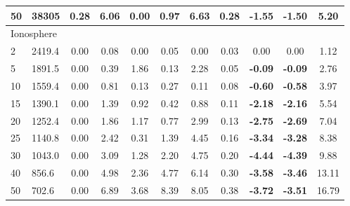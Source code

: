 {\begin{longtable}{@{}llccccccccc@{}}
\multicolumn{1}{l|}{50} & \multicolumn{1}{l|}{38305}      & 0.28 & \multicolumn{1}{c|}{6.06}  & 0.00  & \multicolumn{1}{c|}{0.97} & 6.63  & \multicolumn{1}{c|}{0.28} & \textbf{-1.55} & \textbf{-1.50} & 5.20  \\ \hline
\multicolumn{11}{l}{Ionosphere}                                                                                                                                                                                 \\ \hline
\multicolumn{1}{l|}{2}  & \multicolumn{1}{l|}{2419.4}     & 0.00 & \multicolumn{1}{c|}{0.08}  & 0.00  & \multicolumn{1}{c|}{0.05} & 0.00  & \multicolumn{1}{c|}{0.03} & 0.00           & 0.00           & 1.12  \\
\multicolumn{1}{l|}{5}  & \multicolumn{1}{l|}{1891.5}     & 0.00 & \multicolumn{1}{c|}{0.39}  & 1.86  & \multicolumn{1}{c|}{0.13} & 2.28  & \multicolumn{1}{c|}{0.05} & \textbf{-0.09} & \textbf{-0.09} & 2.76  \\
\multicolumn{1}{l|}{10} & \multicolumn{1}{l|}{1559.4}     & 0.00 & \multicolumn{1}{c|}{0.81}  & 0.13  & \multicolumn{1}{c|}{0.27} & 0.11  & \multicolumn{1}{c|}{0.08} & \textbf{-0.60} & \textbf{-0.58} & 3.97  \\
\multicolumn{1}{l|}{15} & \multicolumn{1}{l|}{1390.1}     & 0.00 & \multicolumn{1}{c|}{1.39}  & 0.92  & \multicolumn{1}{c|}{0.42} & 0.88  & \multicolumn{1}{c|}{0.11} & \textbf{-2.18} & \textbf{-2.16} & 5.54  \\
\multicolumn{1}{l|}{20} & \multicolumn{1}{l|}{1252.4}     & 0.00 & \multicolumn{1}{c|}{1.86}  & 1.17  & \multicolumn{1}{c|}{0.77} & 2.99  & \multicolumn{1}{c|}{0.13} & \textbf{-2.75} & \textbf{-2.69} & 7.04  \\
\multicolumn{1}{l|}{25} & \multicolumn{1}{l|}{1140.8}     & 0.00 & \multicolumn{1}{c|}{2.42}  & 0.31  & \multicolumn{1}{c|}{1.39} & 4.45  & \multicolumn{1}{c|}{0.16} & \textbf{-3.34} & \textbf{-3.28} & 8.38  \\
\multicolumn{1}{l|}{30} & \multicolumn{1}{l|}{1043.0}     & 0.00 & \multicolumn{1}{c|}{3.09}  & 1.28  & \multicolumn{1}{c|}{2.20} & 4.75  & \multicolumn{1}{c|}{0.20} & \textbf{-4.44} & \textbf{-4.39} & 9.88  \\
\multicolumn{1}{l|}{40} & \multicolumn{1}{l|}{856.6}      & 0.00 & \multicolumn{1}{c|}{4.98}  & 2.36  & \multicolumn{1}{c|}{4.77} & 6.14  & \multicolumn{1}{c|}{0.30} & \textbf{-3.58} & \textbf{-3.46} & 13.11 \\
\multicolumn{1}{l|}{50} & \multicolumn{1}{l|}{702.6}      & 0.00 & \multicolumn{1}{c|}{6.89}  & 3.68  & \multicolumn{1}{c|}{8.39} & 8.05  & \multicolumn{1}{c|}{0.38} & \textbf{-3.72} & \textbf{-3.51} & 16.79 \\ \hline

\end{longtable}}
